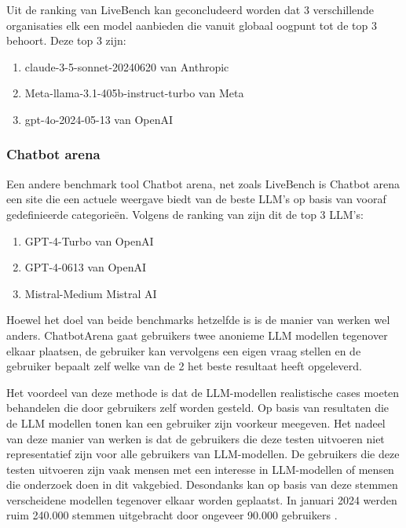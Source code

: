     Uit de ranking van LiveBench kan geconcludeerd worden dat 3 verschillende organisaties elk een model aanbieden die vanuit globaal oogpunt tot de top 3 behoort. Deze top 3 zijn: 
    \begin{enumerate}
        \item claude-3-5-sonnet-20240620 van Anthropic
        \item Meta-llama-3.1-405b-instruct-turbo van Meta
        \item gpt-4o-2024-05-13 van OpenAI
    \end{enumerate}
    
    \subsubsection{Chatbot arena} 
    
    Een andere benchmark tool Chatbot arena, net zoals LiveBench is Chatbot arena een site die een actuele weergave biedt van de beste LLM's op basis van vooraf gedefinieerde categorieën. 
    Volgens de ranking van \textcite{LiveBench2025} zijn dit de top 3 LLM's:
    
    \begin{enumerate}
        \item GPT-4-Turbo van OpenAI
        \item GPT-4-0613 van OpenAI
        \item Mistral-Medium Mistral AI
    \end{enumerate}
    
    Hoewel het doel van beide benchmarks hetzelfde is is de manier van werken wel anders. ChatbotArena gaat gebruikers twee anonieme LLM modellen tegenover elkaar plaatsen, de gebruiker kan vervolgens een eigen vraag stellen en de gebruiker bepaalt zelf welke van de 2 het beste resultaat heeft opgeleverd.
    
    Het voordeel van deze methode is dat de LLM-modellen realistische cases moeten behandelen die door gebruikers zelf worden gesteld. Op basis van resultaten die de LLM modellen tonen kan een gebruiker zijn voorkeur meegeven. Het nadeel van deze manier van werken is dat de gebruikers die deze testen uitvoeren niet representatief zijn voor alle gebruikers van LLM-modellen. De gebruikers die deze testen uitvoeren zijn vaak mensen met een interesse in LLM-modellen of mensen die onderzoek doen in dit vakgebied. Desondanks kan op basis van deze stemmen verscheidene modellen tegenover elkaar worden geplaatst. In januari 2024 werden ruim 240.000 stemmen uitgebracht door ongeveer 90.000 gebruikers \autocite{Chiang2024}. 
    
